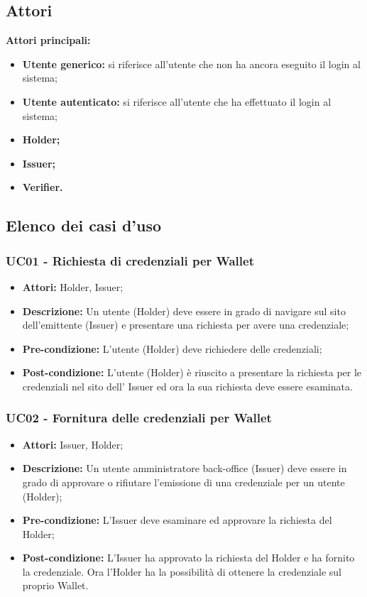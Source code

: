 \subsection{Attori}
\textbf{Attori principali:}
\begin{itemize}
    \item\textbf{Utente generico:} si riferisce all’utente che non ha ancora eseguito il login al sistema;
    \item\textbf{Utente autenticato:} si riferisce all’utente che ha effettuato il login al sistema;
    \item\textbf{Holder;}
    \item\textbf{Issuer;}
    \item\textbf{Verifier.}
\end{itemize}


\subsection{Elenco dei casi d'uso}
\subsubsection{UC01 - Richiesta di credenziali per Wallet}
\begin{itemize}
\item \textbf{Attori:} Holder, Issuer;
\item \textbf{Descrizione:} Un utente (Holder) deve essere in grado di navigare sul sito dell'emittente (Issuer) e presentare una richiesta per avere una credenziale;
\item \textbf{Pre-condizione:} L’utente (Holder) deve richiedere delle credenziali;
\item \textbf{Post-condizione:} L’utente (Holder) è riuscito a presentare la richiesta per le credenziali nel sito dell’ Issuer ed ora la sua richiesta deve essere esaminata.
\end{itemize}

\subsubsection{UC02 - Fornitura delle credenziali per Wallet}
\begin{itemize}
\item \textbf{Attori:} Issuer, Holder;
\item \textbf{Descrizione:} Un utente amministratore back-office (Issuer) deve essere in grado di approvare o rifiutare l'emissione di una credenziale per un utente (Holder);
\item \textbf{Pre-condizione:} L’Issuer deve esaminare ed approvare la richiesta del Holder;
\item \textbf{Post-condizione:} L’Issuer ha approvato la richiesta del Holder e ha fornito la credenziale. Ora l'Holder ha la possibilità di ottenere la credenziale sul proprio Wallet.
\end{itemize}

